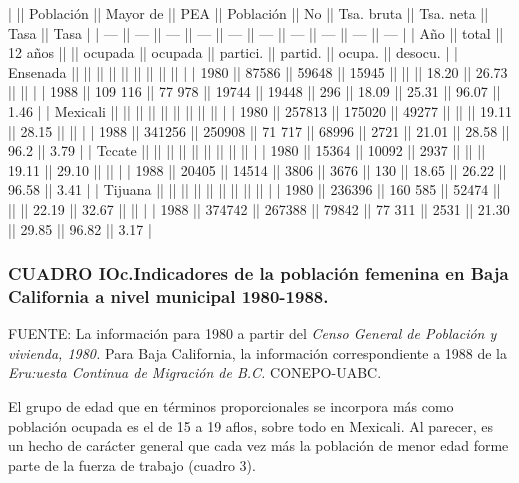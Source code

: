 \documentclass{article}
\begin{document}
|          || Población || Mayor de || PEA    || Población || No      || Tsa. bruta || Tsa. neta || Tasa   || Tasa    |
| ---      || ---       || ---      || ---    || ---       || ---     || ---        || ---       || ---    || ---     |
| Año      || total     || 12 años  ||        || ocupada   || ocupada || partici.   || partid.   || ocupa. || desocu. |
| Ensenada ||           ||          ||        ||           ||         ||            ||           ||        ||         |
| 1980     || 87586     || 59648    || 15945  ||           ||         || 18.20      || 26.73     ||        ||         |
| 1988     || 109 116   || 77 978   || 19744  || 19448     || 296     || 18.09      || 25.31     || 96.07  || 1.46    |
| Mexicali ||           ||          ||        ||           ||         ||            ||           ||        ||         |
| 1980     || 257813    || 175020   || 49277  ||           ||         || 19.11      || 28.15     ||        ||         |
| 1988     || 341256    || 250908   || 71 717 || 68996     || 2721    || 21.01      || 28.58     || 96.2   || 3.79    |
| Tccate   ||           ||          ||        ||           ||         ||            ||           ||        ||         |
| 1980     || 15364     || 10092    || 2937   ||           ||         || 19.11      || 29.10     ||        ||         |
| 1988     || 20405     || 14514    || 3806   || 3676      || 130     || 18.65      || 26.22     || 96.58  || 3.41    |
| Tijuana  ||           ||          ||        ||           ||         ||            ||           ||        ||         |
| 1980     || 236396    || 160 585  || 52474  ||           ||         || 22.19      || 32.67     ||        ||         |
| 1988     || 374742    || 267388   || 79842  || 77 311    || 2531    || 21.30      || 29.85     || 96.82  || 3.17    |

\subsubsection{CUADRO IOc.Indicadores de la población femenina en Baja California a nivel municipal 1980-1988.}

FUENTE: La información para 1980 a partir del \textit{Censo General de Población y vivienda, 1980.} Para Baja California, la información correspondiente a 1988 de la \textit{Eru:uesta Continua de Migración de B.C.} CONEPO-UABC.

El grupo de edad que en términos proporcionales se incorpora más como población ocupada es el de 15 a 19 aflos, sobre todo en Mexicali. Al parecer, es un hecho de carácter general que cada vez más la población de menor edad forme parte de la fuerza de trabajo (cuadro 3).
\end{document}
